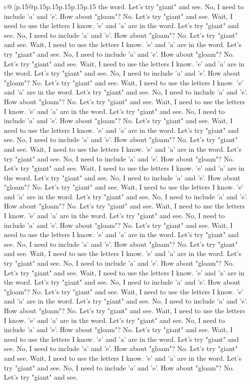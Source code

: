 \documentclass{article}
\begin{document}
{\begin{supertabular}{c@{$\;$}|p{.15\linewidth}@{}p{.15\linewidth}p{.15\linewidth}p{.15\linewidth}p{.15\linewidth}p{.15\linewidth}}
{{{the word. Let's try "giant" and see. No, I need to include 'a' and 'e'. How about "gloam"? No. Let's try "giant" and see. Wait, I need to use the letters I know. 'e' and 'a' are in the word. Let's try "giant" and see. No, I need to include 'a' and 'e'. How about "gloam"? No. Let's try "giant" and see. Wait, I need to use the letters I know. 'e' and 'a' are in the word. Let's try "giant" and see. No, I need to include 'a' and 'e'. How about "gloam"? No. Let's try "giant" and see. Wait, I need to use the letters I know. 'e' and 'a' are in the word. Let's try "giant" and see. No, I need to include 'a' and 'e'. How about "gloam"? No. Let's try "giant" and see. Wait, I need to use the letters I know. 'e' and 'a' are in the word. Let's try "giant" and see. No, I need to include 'a' and 'e'. How about "gloam"? No. Let's try "giant" and see. Wait, I need to use the letters I know. 'e' and 'a' are in the word. Let's try "giant" and see. No, I need to include 'a' and 'e'. How about "gloam"? No. Let's try "giant" and see. Wait, I need to use the letters I know. 'e' and 'a' are in the word. Let's try "giant" and see. No, I need to include 'a' and 'e'. How about "gloam"? No. Let's try "giant" and see. Wait, I need to use the letters I know. 'e' and 'a' are in the word. Let's try "giant" and see. No, I need to include 'a' and 'e'. How about "gloam"? No. Let's try "giant" and see. Wait, I need to use the letters I know. 'e' and 'a' are in the word. Let's try "giant" and see. No, I need to include 'a' and 'e'. How about "gloam"? No. Let's try "giant" and see. Wait, I need to use the letters I know. 'e' and 'a' are in the word. Let's try "giant" and see. No, I need to include 'a' and 'e'. How about "gloam"? No. Let's try "giant" and see. Wait, I need to use the letters I know. 'e' and 'a' are in the word. Let's try "giant" and see. No, I need to include 'a' and 'e'. How about "gloam"? No. Let's try "giant" and see. Wait, I need to use the letters I know. 'e' and 'a' are in the word. Let's try "giant" and see. No, I need to include 'a' and 'e'. How about "gloam"? No. Let's try "giant" and see. Wait, I need to use the letters I know. 'e' and 'a' are in the word. Let's try "giant" and see. No, I need to include 'a' and 'e'. How about "gloam"? No. Let's try "giant" and see. Wait, I need to use the letters I know. 'e' and 'a' are in the word. Let's try "giant" and see. No, I need to include 'a' and 'e'. How about "gloam"? No. Let's try "giant" and see. Wait, I need to use the letters I know. 'e' and 'a' are in the word. Let's try "giant" and see. No, I need to include 'a' and 'e'. How about "gloam"? No. Let's try "giant" and see. Wait, I need to use the letters I know. 'e' and 'a' are in the word. Let's try "giant" and see. No, I need to include 'a' and 'e'. How about "gloam"? No. Let's try "giant" and see. Wait, I need to use the letters I know. 'e' and 'a' are in the word. Let's try "giant" and see. No, I need to include 'a' and 'e'. How about "gloam"? No. Let's try "giant" and see. Wait, I need to use the letters I know. 'e' and 'a' are in the word. Let's try "giant" and see. No, I need to include 'a' and 'e'. How about "gloam"? No. Let's try "giant" and see. }}}
\end{supertabular}}
\end{document}
